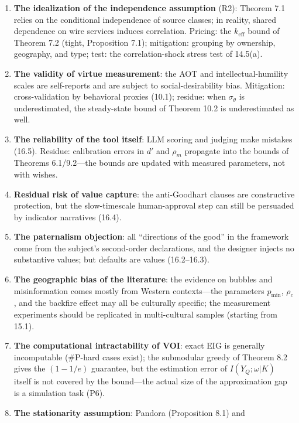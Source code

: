 \documentclass[
  11pt]{article}
\providecommand{\tightlist}{%
  \setlength{\itemsep}{0pt}\setlength{\parskip}{0pt}}
\begin{document}
\begin{enumerate}
\def\labelenumi{\arabic{enumi}.}
\tightlist
\item
  \textbf{The idealization of the independence assumption} (R2): Theorem
  7.1 relies on the conditional independence of source classes; in
  reality, shared dependence on wire services induces correlation.
  Pricing: the \(k_{\mathrm{eff}}\) bound of Theorem 7.2 (tight,
  Proposition 7.1); mitigation: grouping by ownership, geography, and
  type; test: the correlation-shock stress test of 14.5(a).
\item
  \textbf{The validity of virtue measurement}: the AOT and
  intellectual-humility scales are self-reports and are subject to
  social-desirability bias. Mitigation: cross-validation by behavioral
  proxies (10.1); residue: when \(\sigma_\theta\) is underestimated, the
  steady-state bound of Theorem 10.2 is underestimated as well.
\item
  \textbf{The reliability of the tool itself}: LLM scoring and judging
  make mistakes (16.5). Residue: calibration errors in \(d'\) and
  \(\rho_m\) propagate into the bounds of Theorems 6.1/9.2---the bounds
  are updated with measured parameters, not with wishes.
\item
  \textbf{Residual risk of value capture}: the anti-Goodhart clauses are
  constructive protection, but the slow-timescale human-approval step
  can still be persuaded by indicator narratives (16.4).
\item
  \textbf{The paternalism objection}: all ``directions of the good'' in
  the framework come from the subject's second-order declarations, and
  the designer injects no substantive values; but defaults are values
  (16.2--16.3).
\item
  \textbf{The geographic bias of the literature}: the evidence on
  bubbles and misinformation comes mostly from Western contexts---the
  parameters \(p_{\min}\), \(\rho_c\), and the backfire effect may all
  be culturally specific; the measurement experiments should be
  replicated in multi-cultural samples (starting from 15.1).
\item
  \textbf{The computational intractability of VOI}: exact EIG is
  generally incomputable (\#P-hard cases exist); the submodular greedy
  of Theorem 8.2 gives the \((1-1/e)\) guarantee, but the estimation
  error of \(I(Y_Q;\omega|K)\) itself is not covered by the bound---the
  actual size of the approximation gap is a simulation task (P6).
\item
  \textbf{The stationarity assumption}: Pandora (Proposition 8.1) and

\end{enumerate}
\end{document}
